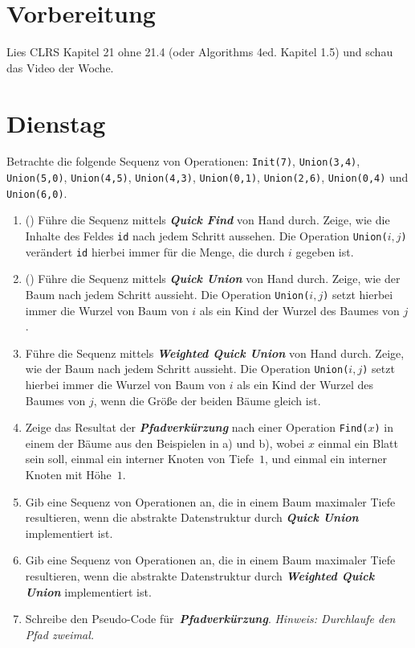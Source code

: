\documentclass{uebung_cs}
\newcommand{\qfind}{\textit{\textbf{Quick Find}}}
\newcommand{\qunion}{\textit{\textbf{Quick Union}}}
\newcommand{\wqunion}{\textit{\textbf{Weighted Quick Union}}}
\newcommand{\pathcomp}{\textit{\textbf{Pfadverkürzung}}}
\begin{document}
\section*{Vorbereitung}
Lies CLRS Kapitel 21 ohne 21.4 (oder Algorithms 4ed. Kapitel 1.5) und schau das Video der Woche.

\section*{Dienstag}
\begin{aufgabe}\label{tue-first}
	Betrachte die folgende Sequenz von Operationen:
	\texttt{Init(7)}, \texttt{Union(3,4)}, \texttt{Union(5,0)}, \texttt{Union(4,5)}, \texttt{Union(4,3)}, \texttt{Union(0,1)}, \texttt{Union(2,6)}, \texttt{Union(0,4)} und \texttt{Union(6,0)}.
	\begin{enumerate}
		\item (\warmup) Führe die Sequenz mittels \qfind{} von Hand durch.
		Zeige, wie die Inhalte des Feldes \texttt{id} nach jedem Schritt aussehen.
		Die Operation \texttt{Union($i,j$)} verändert \texttt{id} hierbei immer für die Menge, die durch $i$ gegeben ist.
		\item (\warmup) Führe die Sequenz mittels \qunion{} von Hand durch.
		Zeige, wie der Baum nach jedem Schritt aussieht.
		Die Operation \texttt{Union($i,j$)} setzt hierbei immer die Wurzel von Baum von $i$ als ein Kind der Wurzel des Baumes von $j$.
		\item Führe die Sequenz mittels \wqunion{} von Hand durch.
		Zeige, wie der Baum nach jedem Schritt aussieht.
		Die Operation \texttt{Union($i,j$)} setzt hierbei immer die Wurzel von Baum von $i$ als ein Kind der Wurzel des Baumes von $j$, wenn die Größe der beiden Bäume gleich ist.
		\item Zeige das Resultat der \pathcomp{} nach einer Operation \texttt{Find($x$)} in einem der Bäume aus den Beispielen in a) und b), wobei $x$ einmal ein Blatt sein soll, einmal ein interner Knoten von Tiefe~$1$, und einmal ein interner Knoten mit Höhe~$1$.
		\item Gib eine Sequenz von Operationen an, die in einem Baum maximaler Tiefe resultieren, wenn die abstrakte Datenstruktur durch \qunion{} implementiert ist.
		\item Gib eine Sequenz von Operationen an, die in einem Baum maximaler Tiefe resultieren, wenn die abstrakte Datenstruktur durch \wqunion{} implementiert ist.
		\item Schreibe den Pseudo-Code für~\pathcomp{}. \emph{Hinweis: Durchlaufe den Pfad zweimal.}
	\end{enumerate}
\end{aufgabe}
\end{document}
